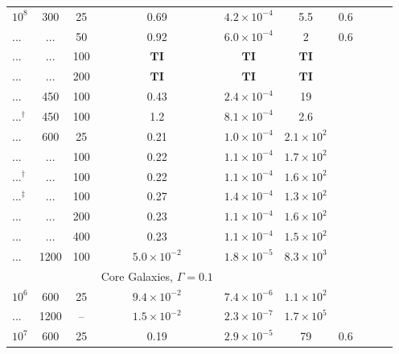 \documentclass[usenatbib,fleqn]{mn2e}
\begin{document}
\begin{table}
\begin{threeparttable}
\begin{minipage}{18cm}
\begin{tabular}{lccccccccc}
$    10^{ 8 }$ & 300 & 25 & 0.69 & $ 4.2 \times 10^{ -4 }$ & 5.5 & 0.6\\
... & ... & 50 & 0.92 & $ 6.0 \times 10^{ -4 }$ & 2 & 0.6\\
 ... & ... & 100 & $\mathbf{TI}$ & $\mathbf{TI}$ & $\mathbf{TI}$ \\
... & ... & 200 & $\mathbf{TI}$ & $\mathbf{TI}$ & $\mathbf{TI}$ \\
... & 450 & 100 & 0.43 & $ 2.4 \times 10^{ -4 }$ & 19 \\
...$^{\dagger}$ & 450 & 100 & 1.2 & $ 8.1 \times 10^{ -4 }$ & 2.6 \\
... & 600 & 25 & 0.21 & $ 1.0 \times 10^{ -4 }$ & $ 2.1 \times 10^{ 2 }$ \\
... & ... & 100 & 0.22 & $ 1.1 \times 10^{ -4 }$ & $ 1.7 \times 10^{ 2
}$ \\
...$^{\dagger}$ & ... & 100 & 0.22 & $ 1.1 \times 10^{ -4 }$ & $ 1.6 \times 10^{ 2 }$ \\
...$^{\ddagger}$  & ... & 100 & 0.27 & $ 1.4 \times 10^{ -4 }$ & $ 1.3 \times 10^{ 2
}$ \\
... & ... & 200 & 0.23 & $ 1.1 \times 10^{ -4 }$ & $ 1.6 \times 10^{ 2 }$ \\
... & ... & 400 & 0.23 & $ 1.1 \times 10^{ -4 }$ & $ 1.5 \times 10^{ 2 }$ \\
... & 1200 & 100 & $ 5.0 \times 10^{ -2 }$ & $ 1.8 \times 10^{ -5 }$ & $ 8.3 \times 10^{ 3 }$ \\
\hline
& & & Core Galaxies, $\Gamma = 0.1$ & & & & & & \\
$    10^{ 6 }$ & 600 & 25 & $ 9.4 \times 10^{ -2 }$ & $ 7.4 \times 10^{ -6 }$ & $ 1.1 \times 10^{ 2 }$ \\
... & 1200 & -- & $ 1.5 \times 10^{ -2 }$ & $ 2.3 \times 10^{ -7 }$ & $ 1.7 \times 10^{ 5 }$ \\
$    10^{ 7 }$ & 600 & 25 & 0.19 & $ 2.9 \times 10^{ -5 }$ & 79 & 0.6 \\

\end{tabular}
\end{minipage}
\end{threeparttable}
\end{table}
\end{document}
